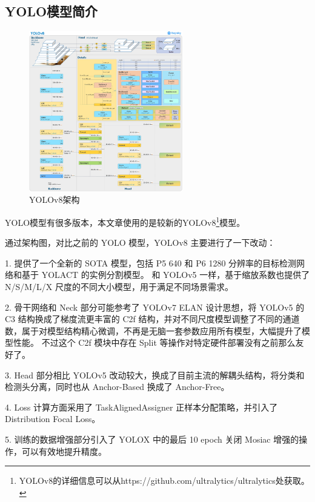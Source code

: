 \subsection{YOLO模型简介}


\begin{figure}
    \centering %
    \includegraphics[height=7cm]{../../YOLO/pics/img1.png}
    \caption{YOLOv8架构}
\end{figure}

YOLO模型有很多版本，本文章使用的是较新的YOLOv8\footnote{YOLOv8的详细信息可以从https://github.com/ultralytics/ultralytics处获取。}模型。

通过架构图，对比之前的 YOLO 模型，YOLOv8 主要进行了一下改动： \par
1. 提供了一个全新的 SOTA 模型，包括 P5 640 和 P6 1280 分辨率的目标检测网络和基于 YOLACT 的实例分割模型。
和 YOLOv5 一样，基于缩放系数也提供了 N/S/M/L/X 尺度的不同大小模型，用于满足不同场景需求。 \par
2. 骨干网络和 Neck 部分可能参考了 YOLOv7 ELAN 设计思想，将 YOLOv5 的 C3 结构换成了梯度流更丰富的 C2f 结构，并对不同尺度模型调整了不同的通道数，属于对模型结构精心微调，不再是无脑一套参数应用所有模型，大幅提升了模型性能。
不过这个 C2f 模块中存在 Split 等操作对特定硬件部署没有之前那么友好了。\par
3. Head 部分相比 YOLOv5 改动较大，换成了目前主流的解耦头结构，将分类和检测头分离，同时也从 Anchor-Based 换成了 Anchor-Free。\par
4. Loss 计算方面采用了 TaskAlignedAssigner 正样本分配策略，并引入了 Distribution Focal Loss。\par
5. 训练的数据增强部分引入了 YOLOX 中的最后 10 epoch 关闭 Mosiac 增强的操作，可以有效地提升精度。\par



